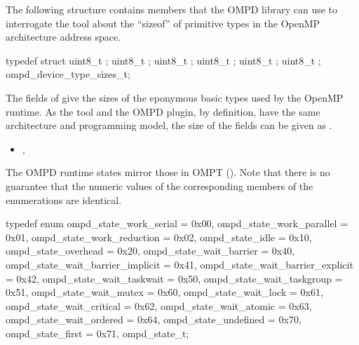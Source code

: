 \label{ompd:ompd_device_type_sizes_t}
The following structure contains members that the OMPD library can use
to interrogate the tool about the ``sizeof'' of primitive types in the OpenMP architecture 
address space.

\format

\begin{ccppspecific}
\begin{ompSyntax}
typedef struct {
  uint8_t ;
  uint8_t ;
  uint8_t ;
  uint8_t ;
  uint8_t ;
  uint8_t ;
} ompd_device_type_sizes_t;
\end{ompSyntax}
\end{ccppspecific}


\descr
The fields of  give the sizes of
the eponymous basic types used by the OpenMP runtime.
As the tool and the OMPD plugin, by definition, have the same
architecture and programming model, the size of the fields can be given
as .

\crossreferences
\begin{itemize}
	\item
	, 
\end{itemize}


The OMPD runtime states mirror those in OMPT (). Note that there is no guarantee that 
the numeric values of the corresponding members of the enumerations are identical.

\format

\begin{ccppspecific}
\begin{ompSyntax}
typedef enum {
  ompd_state_work_serial = 0x00,
  ompd_state_work_parallel = 0x01,
  ompd_state_work_reduction = 0x02,
  ompd_state_idle = 0x10,
  ompd_state_overhead = 0x20,
  ompd_state_wait_barrier = 0x40,
  ompd_state_wait_barrier_implicit = 0x41,
  ompd_state_wait_barrier_explicit = 0x42,
  ompd_state_wait_taskwait = 0x50,
  ompd_state_wait_taskgroup = 0x51,
  ompd_state_wait_mutex = 0x60,
  ompd_state_wait_lock = 0x61,
  ompd_state_wait_critical = 0x62,
  ompd_state_wait_atomic = 0x63,
  ompd_state_wait_ordered = 0x64,
  ompd_state_undefined = 0x70,
  ompd_state_first = 0x71,
} ompd_state_t;
\end{ompSyntax}
\end{ccppspecific}


